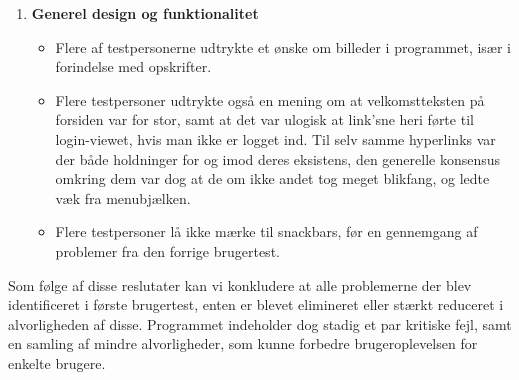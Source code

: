\begin{enumerate}
\begin{itemize}
   \end{itemize}
   \item \textbf{Generel design og funktionalitet}
   \begin{itemize}
      \item Flere af testpersonerne udtrykte et ønske om billeder i programmet, især i forindelse med opskrifter.
      \item Flere testpersoner udtrykte også en mening om at velkomstteksten på forsiden var for stor, samt at det var ulogisk at link'sne heri førte til login-viewet, hvis man ikke er logget ind.
      Til selv samme hyperlinks var der både holdninger for og imod deres eksistens, den generelle konsensus omkring dem var dog at de om ikke andet tog meget blikfang, og ledte væk fra menubjælken.
      \item Flere testpersoner lå ikke mærke til snackbars, før en gennemgang af problemer fra den forrige brugertest.
   \end{itemize}
\end{enumerate}

Som følge af disse reslutater kan vi konkludere at alle problemerne der blev identificeret i første brugertest, enten er blevet elimineret eller stærkt reduceret i alvorligheden af disse. 
Programmet indeholder dog stadig et par kritiske fejl, samt en samling af mindre alvorligheder, som kunne forbedre brugeroplevelsen for enkelte brugere.